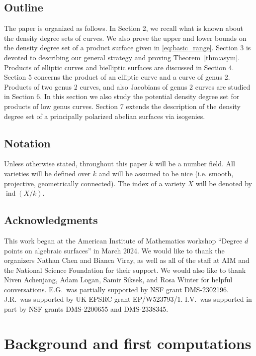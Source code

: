 \documentclass[a4paper,11pt]{amsart}
\theoremstyle{plain}
\theoremstyle{remark}
\newcommand{\ind}{\operatorname{ind}}
\begin{document}
\subsection{Outline}
The paper is organized as follows. In Section 2, we recall what is known about the density degree sets of curves.  We also prove the upper and lower bounds on the density degree set of a product surface given in \eqref{eq:basic_range}. Section 3 is devoted to describing our general strategy and proving Theorem~\ref{thm:asym}. Products of elliptic curves and bielliptic surfaces are discussed in Section 4. Section 5 concerns the product of an elliptic curve and a curve of genus 2. Products of two genus 2 curves, and also Jacobians of genus 2 curves are studied in Section 6. 
In this section we also study the potential density degree set for products of low genus curves. Section 7 extends the description of the density degree set of a principally polarized abelian surfaces via isogenies.


\subsection{Notation} Unless otherwise stated, throughout this paper $k$ will be a number field. All varieties will be defined over $k$ and will be assumed to be nice (i.e. smooth, projective, geometrically connected). 
The index of a variety $X$ will be denoted by $\ind(X/k)$.

\subsection*{Acknowledgments}

This work began at the American Institute of Mathematics workshop ``Degree \(d\) points on algebraic surfaces'' in March 2024.  We would like to thank  the organizers Nathan Chen and Bianca Viray, as well as all of the staff at AIM and the National Science Foundation for their support.
We would also like to thank Niven Achenjang, Adam Logan, Samir Siksek, and  Rosa Winter for helpful conversations.
E.G.~was partially supported by NSF grant DMS-2302196. 
J.R.~was supported by UK EPSRC grant EP/W523793/1.  I.V.~was supported in
part by NSF grants DMS-2200655 and DMS-2338345. 



\section{Background and first computations}\label{bounds} 
\end{document}
